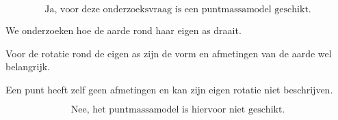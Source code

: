 \documentclass{ximera}
\begin{document}
\begin{oefening}{\oefB\ESS}
\begin{question}
\begin{oplossing}
  \[
  \boxed{\text{Ja, voor deze onderzoeksvraag is een puntmassamodel geschikt.}}
  \]
  \end{oplossing}
  \end{question}
  
  
  \begin{question}
  We onderzoeken hoe de aarde rond haar eigen as draait.
  
  \begin{oplossing}
  Voor de rotatie rond de eigen as zijn de vorm en afmetingen van de aarde wel
  belangrijk.
  
  Een punt heeft zelf geen afmetingen en kan zijn eigen rotatie niet beschrijven.
  
  \[
  \boxed{\text{Nee, het puntmassamodel is hiervoor niet geschikt.}}
  \]
  \end{oplossing}
  \end{question}
  
  \end{oefening}
  
  
  
\end{document}
